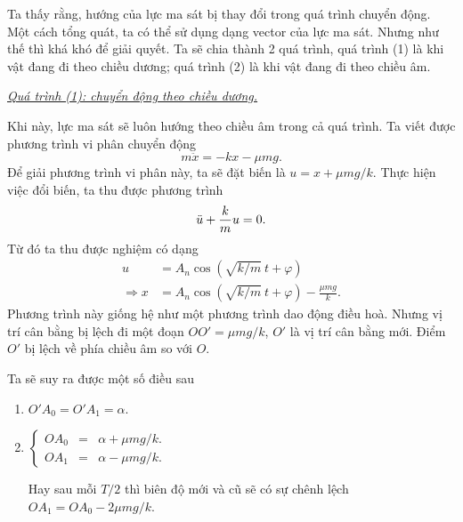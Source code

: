 Ta thấy rằng, hướng của lực ma sát bị thay đổi trong quá trình chuyển động. Một cách tổng quát, ta có thể sử dụng dạng vector của lực ma sát. Nhưng như thế thì khá khó để giải quyết. Ta sẽ chia thành 2 quá trình, quá trình (1) là khi vật đang đi theo chiều dương; quá trình (2) là khi vật đang đi theo chiều âm.



\vspace{2mm}

\underline{\textit{Quá trình (1): chuyển động theo chiều dương.}}
\vspace{2mm}

Khi này, lực ma sát sẽ luôn hướng theo chiều âm trong cả quá trình. Ta viết được phương trình vi phân chuyển động
\begin{equation}
    m \ddot{x} =  - k x - \mu  m g.
    \label{eq:1.4}
\end{equation}
Để giải phương trình vi phân này, ta sẽ đặt biến là $u = x + \mu mg/k$. Thực hiện việc đổi biến, ta thu được phương trình
\begin{equation*}
    \ddot{u} + {\frac{k}{m} \displaystyle} u = 0.
\end{equation*}
Từ đó ta thu được nghiệm có dạng
\begin{equation}
    \begin{split}
        u &= A_n \cos{\left(\sqrt{k/m} \ t + \varphi \right)} \\
        \Rightarrow x &= A_n \cos{\left(\sqrt{k/m} \ t + \varphi \right)} - {\displaystyle \frac{\mu m g}{k}}.
    \end{split}
    \label{eq:1.5}
\end{equation}
Phương trình này giống hệ như một phương trình dao động điều hoà. Nhưng vị trí cân bằng bị lệch đi một đoạn $OO' = \mu m g/k$, $O'$ là vị trí cân bằng mới. Điểm $O'$ bị lệch về phía chiều âm so với $O$.
\begin{figure}[!htb]
    \centering
    
    \caption{}
    \label{fig:1.3}
\end{figure}

Ta sẽ suy ra được một số điều sau
\begin{enumerate}
    \item \(O'A_0 = O'A_1 = \alpha\).
    \item 
    \(
    \left\{
        \begin{array}{ccc}
        OA_0 &=& \alpha + \mu mg/k. \\ 
        OA_1 &=& \alpha - \mu mg/k.
        \end{array}
    \right.
    \)
    
    Hay sau mỗi \(T/2\) thì biên độ mới và cũ sẽ có sự chênh lệch
    \(OA_1 = OA_0 - 2 \mu mg/k\).
\end{enumerate}
\vspace{2mm}

